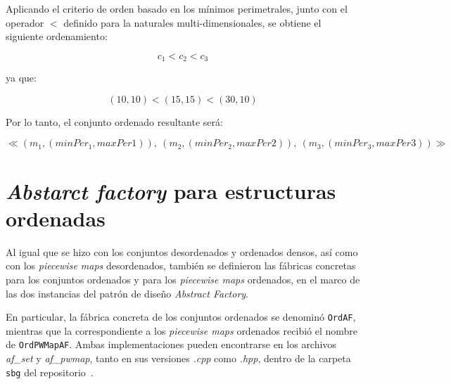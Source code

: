 Aplicando el criterio de orden basado en los mínimos perimetrales, junto con el operador $<$ definido para la naturales multi-dimensionales, se obtiene el siguiente ordenamiento:

\begin{center}
\[
c_1 < c_2 < c_3
\]

ya que:

\[
(10,10) < (15, 15) < (30, 10)
\]

Por lo tanto, el conjunto ordenado resultante será:

\[
\ll (m_1,(minPer_1, maxPer1)),\ (m_2,(minPer_2, maxPer2)),\ (m_3, (minPer_3, maxPer3))\gg
\]
\end{center}


\section{\textit{Abstarct factory} para estructuras ordenadas}

Al igual que se hizo con los conjuntos desordenados y ordenados densos, 
así como con los \textit{piecewise maps} desordenados, 
también se definieron las fábricas concretas para los conjuntos ordenados 
y para los \textit{piecewise maps} ordenados, en el marco de las dos 
instancias del patrón de diseño \textit{Abstract Factory}. 

En particular, la fábrica concreta de los conjuntos ordenados se denominó 
\texttt{OrdAF}, mientras que la correspondiente a los 
\textit{piecewise maps} ordenados recibió el nombre de \texttt{OrdPWMapAF}. 
Ambas implementaciones pueden encontrarse en los archivos 
\textit{af\_set} y \textit{af\_pwmap}, tanto en sus versiones 
\textit{.cpp} como \textit{.hpp}, dentro de la carpeta \texttt{sbg} 
del repositorio~\cite{sbg}.
